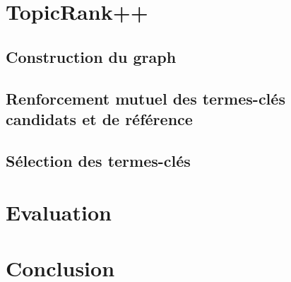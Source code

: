     \section{TopicRank++}
    \label{sec:main-automatic_keyphrase_annotation-supervised_automatic_keyphrase_annotation-topicrank++}
      \subsection{Construction du graph}
      \label{sec:main-automatic_keyphrase_annotation-supervised_automatic_keyphrase_extraction-topicrank++-graph_construction}

      \subsection{Renforcement mutuel des termes-clés candidats et de référence}
      \label{sec:main-automatic_keyphrase_annotation-supervised_automatic_keyphrase_extraction-topicrank++-mutual_reinforcement}

      \subsection{Sélection des termes-clés}
      \label{sec:main-automatic_keyphrase_annotation-supervised_automatic_keyphrase_extraction-topicrank++-keyphrase_selection}

    \section{Evaluation}
    \label{sec:main-automatic_keyphrase_annotation-supervised_automatic_keyphrase_annotation-evaluation}

    \section{Conclusion}
    \label{sec:main-automatic_keyphrase_annotation-supervised_automatic_keyphrase_annotation-conclusion}

